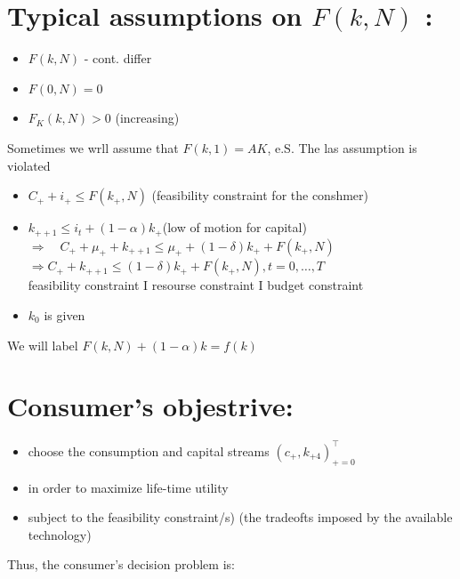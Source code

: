 \documentclass[10pt]{article}
\begin{document}
\section*{Typical assumptions on $F(k, N)$ :}
\begin{itemize}
  \item $F(k, N)$ - cont. differ
  \item $F(0, N)=0$
  \item $F_{K}(k, N)>0$ (increasing)
\end{itemize}

Sometimes we wrll assume that $F(k, 1)=A K$, e.S. The las assumption is violated

\begin{itemize}
  \item $C_{+}+i_{+} \leqslant F\left(k_{+}, N\right)$ (feasibility constraint for the conshmer)
  \item $k_{++1} \leqslant i_{t}+(1-\alpha) k_{+}$(low of motion for capital)\\
$\Rightarrow \quad C_{+}+\mu_{+}+k_{++1} \leq \mu_{+}+(1-\delta) k_{+}+F\left(k_{+}, N\right)$\\
$\Rightarrow C_{+}+k_{++1} \leqslant(1-\delta) k_{+}+F\left(k_{+}, N\right), t=0, \ldots, T$\\
feasibility constraint I resourse constraint I budget constraint
  \item $k_{0}$ is given
\end{itemize}

We will label $F(k, N)+(1-\alpha) k=f(k)$

\section*{Consumer's objestrive:}
\begin{itemize}
  \item choose the consumption and capital streams $\left(c_{+}, k_{+4}\right)_{+=0}^{\top}$
  \item in order to maximize life-time utility
  \item subject to the feasibility constraint/s) (the tradeofts imposed by the available technology)
\end{itemize}

Thus, the consumer's decision problem is:
\end{document}

